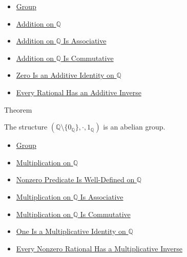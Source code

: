 \begin{dependencies}
\begin{itemize}
  \item \hyperref[def:group]{Group}
  \item \hyperref[def:addition-on-q-classes]{Addition on $\mathbb{Q}$}
  \item \hyperref[thm:addition-on-q-associative]{Addition on $\mathbb{Q}$ Is Associative}
  \item \hyperref[thm:addition-on-q-commutative]{Addition on $\mathbb{Q}$ Is Commutative}
  \item \hyperref[thm:zero-additive-identity-on-q]{Zero Is an Additive Identity on $\mathbb{Q}$}
  \item \hyperref[thm:every-rational-has-additive-inverse]{Every Rational Has an Additive Inverse}
\end{itemize}
\end{dependencies}

\begin{theorembox}{Theorem}
\begin{theorem}
\label{thm:q-nonzero-multiplicative-abelian-group}
The structure
$(\mathbb{Q}\setminus\{0_{\mathbb{Q}}\},\cdot,1_{\mathbb{Q}})$ is an abelian
group.
\end{theorem}
\end{theorembox}

\begin{dependencies}
\begin{itemize}
  \item \hyperref[def:group]{Group}
  \item \hyperref[def:multiplication-on-q-classes]{Multiplication on $\mathbb{Q}$}
  \item \hyperref[lem:nonzero-predicate-well-defined-q]{Nonzero Predicate Is Well-Defined on $\mathbb{Q}$}
  \item \hyperref[thm:multiplication-on-q-associative]{Multiplication on $\mathbb{Q}$ Is Associative}
  \item \hyperref[thm:multiplication-on-q-commutative]{Multiplication on $\mathbb{Q}$ Is Commutative}
  \item \hyperref[thm:one-multiplicative-identity-on-q]{One Is a Multiplicative Identity on $\mathbb{Q}$}
  \item \hyperref[thm:every-nonzero-rational-has-multiplicative-inverse]{Every Nonzero Rational Has a Multiplicative Inverse}
\end{itemize}
\end{dependencies}

